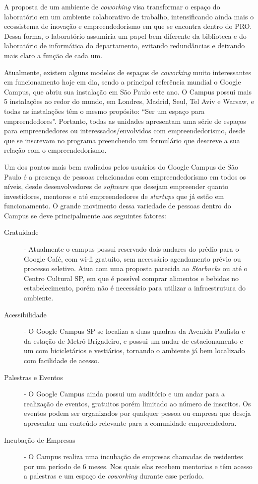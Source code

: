 A proposta de um ambiente de \textit{coworking} visa transformar o espaço do laboratório em um ambiente colaborativo de trabalho, intensificando ainda mais o ecossistema de inovação e empreendedorismo em que se encontra dentro do PRO. Dessa forma, o laboratório assumiria um papel bem diferente da biblioteca e do laboratório de informática do departamento, evitando redundâncias e deixando mais claro a função de cada um.

Atualmente, existem alguns modelos de espaços de \textit{coworking} muito interessantes em funcionamento hoje em dia, sendo a principal referência mundial o Google Campus, que abriu sua instalação em São Paulo este ano. O Campus possui mais 5 instalações ao redor do mundo, em Londres, Madrid, Seul,  Tel Aviv e Warsaw, e todas as instalações têm o mesmo propósito: \enquote{Ser um espaço para empreendedores}. Portanto, todas as unidades apresentam uma série de espaços para empreendedores ou interessados/envolvidos com empreendedorismo, desde que se inscrevam no programa preenchendo um formulário que descreve a sua relação com o empreendedorismo.

Um dos pontos mais bem avaliados pelos usuários do Google Campus de São Paulo é a presença de pessoas relacionadas com empreendedorismo em todos os níveis, desde desenvolvedores de \textit{software} que desejam empreender quanto investidores, mentores e até empreendedores de \textit{startups} que já estão em funcionamento. O grande movimento dessa variedade de pessoas dentro do Campus se deve principalmente aos seguintes fatores: 

\begin{description}
\item[Gratuidade] - Atualmente o campus possui reservado dois andares do prédio para o Google Café, com wi-fi gratuito, sem necessário agendamento prévio ou processo seletivo. Atua com uma proposta parecida ao \textit{Starbucks} ou até o Centro Cultural SP, em que é possível comprar alimentos e bebidas no estabelecimento, porém não é necessário para utilizar a infraestrutura do ambiente.

\item[Acessibilidade] - O Google Campus SP se localiza a duas quadras da Avenida Paulista e da estação de Metrô Brigadeiro, e possui um andar de estacionamento e um com bicicletários e vestiários, tornando o ambiente já bem localizado com facilidade de acesso.

\item[Palestras e Eventos] - O Google Campus ainda possui um auditório e um andar para a realização de eventos, gratuitos porém limitado ao número de inscritos. Os eventos podem ser organizados por qualquer pessoa ou empresa que deseja apresentar um conteúdo relevante para a comunidade empreendedora.

\item[Incubação de Empresas] - O Campus realiza uma incubação de empresas chamadas de residentes por um período de 6 meses. Nos quais elas recebem mentorias e têm acesso a palestras e um espaço de \textit{coworking} durante esse período.
\end{description}

